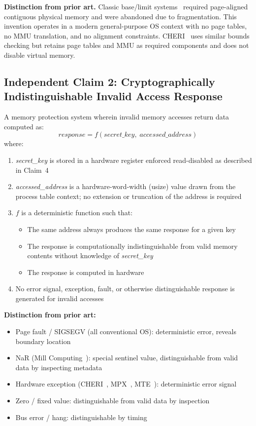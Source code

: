 \documentclass[12pt,letterpaper]{article}
\begin{document}
\textbf{Distinction from prior art.}
Classic base/limit systems~\cite{silberschatz} required page-aligned contiguous
physical memory and were abandoned due to fragmentation.
This invention operates in a modern general-purpose OS context with no page tables,
no MMU translation, and no alignment constraints.
CHERI~\cite{cheri_isca} uses similar bounds checking but retains page tables and
MMU as required components and does not disable virtual memory.

\medskip

\subsection*{Independent Claim 2: Cryptographically Indistinguishable
  Invalid Access Response}

A memory protection system wherein invalid memory accesses return data computed as:
\[
  \textit{response} = f(\textit{secret\_key},\; \textit{accessed\_address})
\]
where:
\begin{enumerate}[label=(\alph*),noitemsep]
  \item \textit{secret\_key} is stored in a hardware register enforced
        read-disabled as described in Claim~4
  \item \textit{accessed\_address} is a hardware-word-width (usize) value
        drawn from the process table context; no extension or truncation of the
        address is required
  \item $f$ is a deterministic function such that:
    \begin{itemize}[noitemsep]
      \item The same address always produces the same response for a given key
      \item The response is computationally indistinguishable from valid memory
            contents without knowledge of \textit{secret\_key}
      \item The response is computed in hardware
    \end{itemize}
  \item No error signal, exception, fault, or otherwise distinguishable response
        is generated for invalid accesses
\end{enumerate}

\textbf{Distinction from prior art:}
\begin{itemize}[noitemsep]
  \item Page fault / SIGSEGV (all conventional OS): deterministic error,
        reveals boundary location
  \item NaR (Mill Computing~\cite{mill}): special sentinel value,
        distinguishable from valid data by inspecting metadata
  \item Hardware exception (CHERI~\cite{cheri_isca}, MPX~\cite{mpx},
        MTE~\cite{arm_mte}): deterministic error signal
  \item Zero / fixed value: distinguishable from valid data by inspection
  \item Bus error / hang: distinguishable by timing
\end{itemize}
\end{document}
